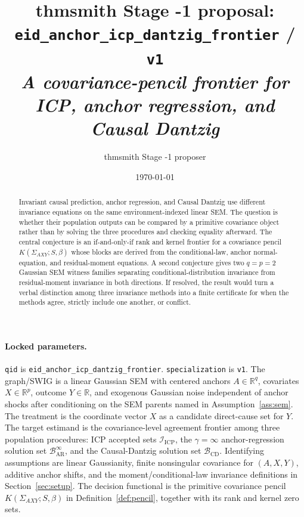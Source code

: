\documentclass[11pt]{article}
\title{thmsmith Stage -1 proposal: \texttt{eid\_anchor\_icp\_dantzig\_frontier} / \texttt{v1}%
  \\ \large\textit{A covariance-pencil frontier for ICP, anchor regression, and Causal Dantzig}}
\author{thmsmith Stage -1 proposer}
\date{\today}
\newcommand{\R}{\mathbb{R}}
\theoremstyle{definition}
\theoremstyle{plain}
\theoremstyle{remark}
\begin{document}
\maketitle


\paragraph{Locked parameters.}
\texttt{qid} is \texttt{eid\_anchor\_icp\_dantzig\_frontier}. \texttt{specialization} is \texttt{v1}. The graph/SWIG is a linear Gaussian SEM with centered anchors $A\in\R^q$, covariates $X\in\R^p$, outcome $Y\in\R$, and exogenous Gaussian noise independent of anchor shocks after conditioning on the SEM parents named in Assumption~\ref{ass:sem}. The treatment is the coordinate vector $X$ as a candidate direct-cause set for $Y$. The target estimand is the covariance-level agreement frontier among three population procedures: ICP accepted sets $\mathcal I_{\mathrm{ICP}}$, the $\gamma=\infty$ anchor-regression solution set $\mathcal B_{\mathrm{AR}}^\infty$, and the Causal-Dantzig solution set $\mathcal B_{\mathrm{CD}}$. Identifying assumptions are linear Gaussianity, finite nonsingular covariance for $(A,X,Y)$, additive anchor shifts, and the moment/conditional-law invariance definitions in Section~\ref{sec:setup}. The decision functional is the primitive covariance pencil $K(\Sigma_{AXY};S,\beta)$ in Definition~\ref{def:pencil}, together with its rank and kernel zero sets.

\begin{abstract}
Invariant causal prediction, anchor regression, and Causal Dantzig use different invariance equations on the same environment-indexed linear SEM. The question is whether their population outputs can be compared by a primitive covariance object rather than by solving the three procedures and checking equality afterward. The central conjecture is an if-and-only-if rank and kernel frontier for a covariance pencil $K(\Sigma_{AXY};S,\beta)$ whose blocks are derived from the conditional-law, anchor normal-equation, and residual-moment equations. A second conjecture gives two $q=p=2$ Gaussian SEM witness families separating conditional-distribution invariance from residual-moment invariance in both directions. If resolved, the result would turn a verbal distinction among three invariance methods into a finite certificate for when the methods agree, strictly include one another, or conflict.
\end{abstract}
\end{document}
